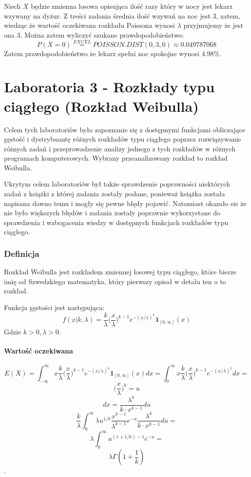 \documentclass{article}
\begin{document}
Niech $X$ będzie zmienna losowa opisująca ilość razy który w nocy jest lekarz wzywany na dyżur. Z treści zadania średnia ilość wzywań na noc jest 3, zatem, wiedząc że wartość oczekiwana rozkładu Poissona wynosi $\lambda$ przyjmujemy że jest ona 3. Można zatem wyliczyć szukane prawdopodobieństwo:
\[ P(X=0) \overset{EXCEL}{=} POISSON.DIST(0,3,0) \approx 0.049787068 \]
Zatem prawdopodobieństwo że lekarz spełni noc spokojne wynosi 4.98\%.

\newpage
\part{Laboratoria 3 - Rozkłady typu ciągłego (Rozkład Weibulla)}

Celem tych laboratoriów było zapoznanie się z dostępnymi funkcjami obliczające gęstość i dystrybuantę różnych rozkładów typu ciągłego poprzez rozwiązywanie różnych zadań i przeprowadzenie analizy jednego z tych rozkładów w różnych programach komputerowych. Wybrany przeanalizowany rozkład to rozkład Weibulla. \\ \par
Ukrytym celem laboratoriów był także sprawdzenie poprawności niektórych zadań z książki z której zadania zostały podane, ponieważ książka została napisana dawno temu i mogły się pewne błędy pojawić. Natomiast okazało sie że nie było większych błędów i zadania zostały poprawnie wykorzystane do sprawdzenia i wzbogacenia wiedzy w dostępnych funkcjach rozkładów typu ciągłego.

\section{Definicja}

Rozkład Weibulla jest rozkładem zmiennej losowej typu ciągłego, które bierze imię od Szwedzkiego matematyka, który pierwszy opisał w detalu ten o to rozkład. \par
Funkcja gęstości jest następująca: \\
$$f(x|k,\lambda) = \frac{k}{\lambda} \Big( \frac{x}{\lambda} \Big) ^{k-1} e^{-(x/\lambda)^k} \boldsymbol{1}_{[0,\infty]}(x)$$
Gdzie $k>0, \lambda>0$. \\

\subsection{Wartość oczekiwana}
$$E(X) = \int_{-\infty}^{\infty} x\frac{k}{\lambda} \Big( \frac{x}{\lambda} \Big) ^{k-1} e^{-(x/\lambda)^k} \boldsymbol{1}_{[0,\infty]}(x)dx = \int_{0}^{\infty} x\frac{k}{\lambda} \Big( \frac{x}{\lambda} \Big) ^{k-1} e^{-(x/\lambda)^k}dx=$$
$$\Big( \frac{x}{\lambda} \Big) ^k = u$$
$$dx = \frac{\lambda^{k}}{k\cdot x^{k-1}}du$$
$$\frac{k}{\lambda} \int_{0}^{\infty} \lambda u^{1/k} \frac{x^{k-1}} {\lambda^{k-1}} e^{-u} \frac{\lambda^{k}}{k\cdot x^{k-1}}du=$$
$$\lambda \int_{0}^{\infty}u^{(1+1/k)-1}e^{-u}=$$
$$\lambda \Gamma (1+\frac{1}{k})$$.
\end{document}
